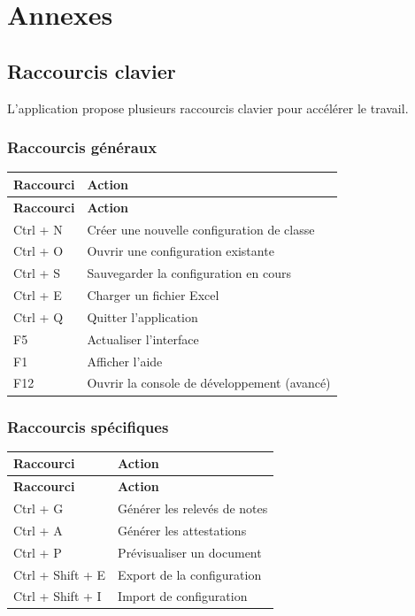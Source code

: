 \section{Annexes}

\subsection{Raccourcis clavier}

L'application propose plusieurs raccourcis clavier pour accélérer le travail.

\subsubsection{Raccourcis généraux}

\begin{longtable}{|p{4cm}|p{10cm}|}
\hline
\textbf{Raccourci} & \textbf{Action} \\
\hline
\endfirsthead
\hline
\textbf{Raccourci} & \textbf{Action} \\
\hline
\endhead
\hline
\endfoot

Ctrl + N & Créer une nouvelle configuration de classe \\
\hline
Ctrl + O & Ouvrir une configuration existante \\
\hline
Ctrl + S & Sauvegarder la configuration en cours \\
\hline
Ctrl + E & Charger un fichier Excel \\
\hline
Ctrl + Q & Quitter l'application \\
\hline
F5 & Actualiser l'interface \\
\hline
F1 & Afficher l'aide \\
\hline
F12 & Ouvrir la console de développement (avancé) \\
\hline
\end{longtable}

\subsubsection{Raccourcis spécifiques}

\begin{longtable}{|p{4cm}|p{10cm}|}
\hline
\textbf{Raccourci} & \textbf{Action} \\
\hline
\endfirsthead
\hline
\textbf{Raccourci} & \textbf{Action} \\
\hline
\endhead
\hline
\endfoot

Ctrl + G & Générer les relevés de notes \\
\hline
Ctrl + A & Générer les attestations \\
\hline
Ctrl + P & Prévisualiser un document \\
\hline
Ctrl + Shift + E & Export de la configuration \\
\hline
Ctrl + Shift + I & Import de configuration \\
\hline
\end{longtable}

